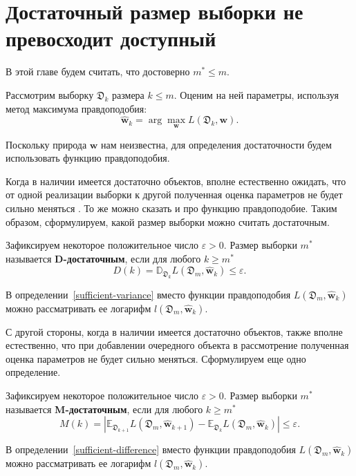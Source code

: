 \section{Достаточный размер выборки не превосходит доступный}\label{sec2}

В этой главе будем считать, что достоверно $m^* \leqslant m$.

Рассмотрим выборку $\mathfrak{D}_k$ размера $k \leqslant m$. Оценим на ней параметры, используя метод максимума правдоподобия:
\[ \hat{\mathbf{w}}_{k} = \arg\max_{\mathbf{w}} L(\mathfrak{D}_k, \mathbf{w}). \]

Поскольку природа $\mathbf{w}$ нам неизвестна, для определения достаточности будем использовать функцию правдоподобия.

Когда в наличии имеется достаточно объектов, вполне естественно ожидать, что от одной реализации выборки к другой полученная оценка параметров не будет сильно меняться \cite{Joseph1997, Joseph1995}. То же можно сказать и про функцию правдоподобие. Таким образом, сформулируем, какой размер выборки можно считать достаточным.

\begin{definition}
    \label{sufficient-variance}
    Зафиксируем некоторое положительное число $\varepsilon > 0$. Размер выборки $m^*$ называется \textbf{D-достаточным}, если для любого $k \geqslant m^*$
    \[ D(k) = \mathbb{D}_{\mathfrak{D}_k} L(\mathfrak{D}_m, \hat{\mathbf{w}}_{k}) \leqslant \varepsilon. \]
\end{definition}
\begin{note}
    В определении~\ref{sufficient-variance} вместо функции правдоподобия $L(\mathfrak{D}_m, \hat{\mathbf{w}}_{k})$ можно рассматривать ее логарифм $l(\mathfrak{D}_m, \hat{\mathbf{w}}_{k})$.
\end{note}

С другой стороны, когда в наличии имеется достаточно объектов, также вполне естественно, что при добавлении очередного объекта в рассмотрение полученная оценка параметров не будет сильно меняться. Сформулируем еще одно определение.

\begin{definition}
    \label{sufficient-difference}
    Зафиксируем некоторое положительное число $\varepsilon > 0$. Размер выборки $m^*$ называется \textbf{M-достаточным}, если для любого $k \geqslant m^*$ 
    \[ M(k) = \left| \mathbb{E}_{\mathfrak{D}_{k+1}} L(\mathfrak{D}_m, \hat{\mathbf{w}}_{k+1}) - \mathbb{E}_{\mathfrak{D}_k} L(\mathfrak{D}_m, \hat{\mathbf{w}}_{k}) \right| \leqslant \varepsilon. \]
\end{definition}
\begin{note}
    В определении~\ref{sufficient-difference} вместо функции правдоподобия $L(\mathfrak{D}_m, \hat{\mathbf{w}}_{k})$ можно рассматривать ее логарифм $l(\mathfrak{D}_m, \hat{\mathbf{w}}_{k})$.
\end{note}

